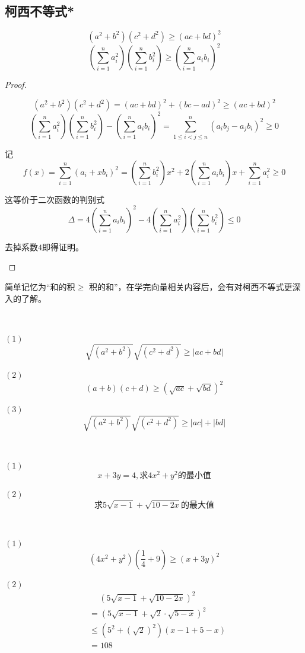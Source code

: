 \subsection{柯西不等式*}
\begin{theorem}[Cauthy不等式]
    \[(a^2+b^2)(c^2+d^2)\geq(ac+bd)^2\]
\[(\sum_{i=1}^{n}a_i^2)(\sum_{i=1}^{n}b_i^2)\geq(\sum_{i=1}^{n}a_ib_i)^2\]
\end{theorem}

\begin{proof}
    \ 

    \begin{way1}
    \[(a^2+b^2)(c^2+d^2)=(ac+bd)^2+(bc-ad)^2\geq (ac+bd)^2\]
    \[(\sum_{i=1}^{n}a_i^2)(\sum_{i=1}^{n}b_i^2)-(\sum_{i=1}^{n}a_ib_i)^2=
    \sum_{1\leq i<j\leq n}^{n}(a_ib_j-a_jb_i)^2\geq 0\]
    \end{way1}
    \begin{way2}
    记\[f(x)=\sum_{i=1}^{n}(a_i+xb_i)^2
    =(\sum_{i=1}^{n}b_i^2)x^2+2(\sum_{i=1}^{n}a_ib_i)x+\sum_{i=1}^{n}a_i^2\geq 0\]

    这等价于二次函数的判别式
    \[\Delta=4(\sum_{i=1}^{n}a_ib_i)^2-4(\sum_{i=1}^{n}a_i^2)(\sum_{i=1}^{n}b_i^2)\leq 0\]
    
    去掉系数$4$即得证明。
    \end{way2}
\end{proof}
简单记忆为“和的积$\geq$ 积的和”，在学完向量相关内容后，会有对柯西不等式更深入的了解。
\begin{corollary}
    \ 

    $(1)$\[\sqrt{(a^2+b^2)}\sqrt{(c^2+d^2)}\geq |ac+bd|\]

    $(2)$\[(a+b)(c+d)\geq(\sqrt{ac}+\sqrt{bd})^2\]

    $(3)$\[\sqrt{(a^2+b^2)}\sqrt{(c^2+d^2)}\geq |ac|+|bd|\]
\end{corollary}
\begin{example}
    \ 

    $(1)$
    \[x+3y=4,\text{求}4x^2+y^2\text{的最小值}\]   

    $(2)$
    \[\text{求}5\sqrt{x-1}+\sqrt{10-2x}\text{的最大值}\]
\end{example}
\begin{jie}
    \ 

    $(1)$
    \[(4x^2+y^2)(\frac{1}{4}+9)\geq(x+3y)^2\]

    $(2)$
    \begin{align*}
    &\quad\ (5\sqrt{x-1}+\sqrt{10-2x})^2 \\
    &=(5\sqrt{x-1}+\sqrt{2}\cdot\sqrt{5-x})^2\\
    &\leq(5^2+(\sqrt{2})^2)(x-1+5-x) \\
    &=108
    \end{align*}
  
\end{jie}
